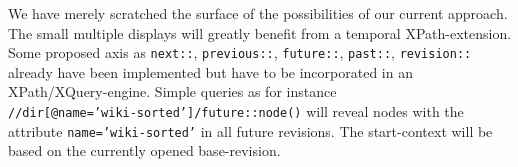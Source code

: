We have merely scratched the surface of the possibilities of our current approach. The small multiple displays will greatly benefit from a temporal XPath-extension. Some proposed axis as \texttt{next::}, \texttt{previous::}, \texttt{future::}, \texttt{past::}, \texttt{revision::} already have been implemented but have to be incorporated in an XPath/XQuery-engine. Simple queries as for instance \\\texttt{//dir[@name='wiki-sorted']/future::node()} will reveal nodes with the attribute \texttt{name='wiki-sorted'} in all future revisions. The start-context will be based on the currently opened base-revision. 
